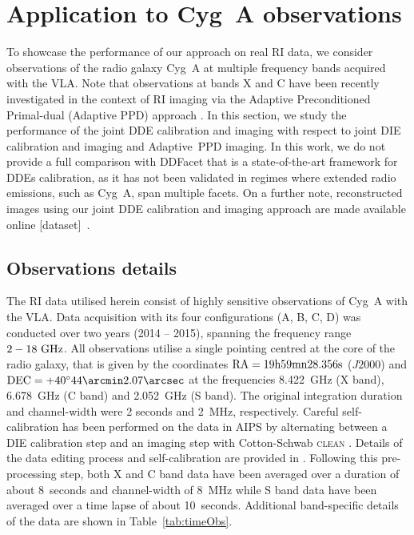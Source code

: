 \documentclass[fleqn,usenatbib]{mnras}
\newcommand{\alg}[1]{\textsc{#1}}
\begin{document}
\section{Application to Cyg~A observations}\label{sec:cyga}
To showcase the performance of our approach on real RI data, we consider observations of the radio galaxy Cyg~A at multiple frequency bands acquired with the {{VLA}}. Note that observations at bands X and C have been recently investigated in the context of RI imaging via the Adaptive Preconditioned Primal-dual ({Adaptive} PPD) approach \citep{Dabbech2018}. In this section, we study the performance of the joint DDE calibration and imaging with respect to joint DIE calibration and imaging and {Adaptive~PPD} imaging. In this work, we do not provide a full comparison with DDFacet \citep{tasse2018} that is a state-of-the-art framework for DDEs calibration, as it has not been validated in regimes where extended radio emissions, such as Cyg~A, span multiple facets. On a further note, reconstructed images using our joint DDE calibration and imaging approach are made available online [dataset]~\citet{Cyg21}.
\subsection{Observations details}\label{ssec:obs}

The RI data utilised herein consist of highly sensitive observations of Cyg~A with the {{VLA}}. {Data acquisition with its four configurations (A, B, C, D) was conducted over two years (2014 -- 2015),} spanning the frequency range $2-18~\rm{GHz}$. All observations utilise a single pointing centred at the core of the radio galaxy, that is given by the coordinates $\rm{RA}=19\rm{h}59\rm{mn}28.356\rm{s}$ ($J2000$) and $\rm{DEC}=+40^{\circ}44\arcmin2.07\arcsec$ at the frequencies 8.422~GHz (X band), 6.678~GHz (C band) and 2.052~GHz (S band). The original integration duration and channel-width were 2 seconds and 2~MHz, respectively. Careful self-calibration has been performed on the data in \alg{AIPS} by alternating between a DIE calibration step and an imaging step with Cotton-Schwab \alg{clean} \citep{csclean1983}. Details of the data editing process and self-calibration are provided in \citet{Sebokolodi2020}. Following this pre-processing step, both X and C band data have been averaged over a duration of about 8~seconds and channel-width of 8~MHz while S band data have been averaged over a time lapse of about 10~seconds. Additional band-specific details of the data are shown in Table~\ref{tab:timeObs}.
%

%
\end{document}
